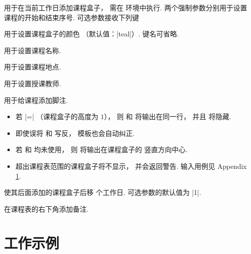 \documentclass[svgnames]{l3doc}
\begin{document}
\begin{documentation}
\begin{function}{\course}
  \begin{syntax}
         
  \end{syntax}
  用于在当前工作日添加课程盒子，
  需在  环境中执行.
  两个强制参数分别用于设置课程的开始和结束序号.
  可选参数接收下列键
  \begin{keyval}
    \item [\key{color}]  用于设置课程盒子的颜色
    （默认值：|teal|）. 键名可省略.
    \item [\key{subject}]  用于设置课程名称.
    \item [\key{location}]  用于设置课程地点.
    \item [\key{lecture}]  用于设置授课教师.
    \item [\key{comment}]  用于给课程添加脚注.
  \end{keyval}
  \begin{texnote}
    \begin{itemize}[leftmargin = 2em]
      \item 若  |=| （课程盒子的高度为 $1$），
      则  和  将输出在同一行，
      并且  将隐藏.
      \item 即使误将  和  写反，
      模板也会自动纠正.
      \item 若  和  均未使用，
      则  将输出在课程盒子的
      竖直方向中心.
      \item 超出课程表范围的课程盒子将不显示，
      并会返回警告.
      输入用例见 Appendix \ref{mwe}.
    \end{itemize}
  \end{texnote}
\end{function}

\begin{function}{\newday}
  \begin{syntax}
     
  \end{syntax}
  使其后面添加的课程盒子后移  个工作日.
  可选参数的默认值为 |1|.
\end{function}

\begin{function}{\more}
  \begin{syntax}
     
  \end{syntax}
  在课程表的右下角添加备注.
\end{function}

\clearpage \appendix \linespread{1.25}

\section{工作示例} \label{mwe}





\end{documentation}
\end{document}
